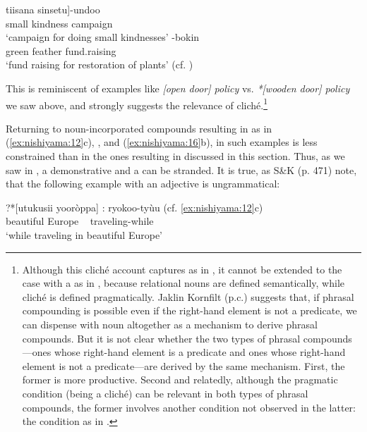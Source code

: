 \documentclass[output=paper]{LSP/langsci}
\begin{document}
\ea\label{ex:nishiyama:26}
 \ea 
 \gll {\ob}tiisana  sinsetu]-undoo\\
     small  {kindness campaign}\\
\glt ‘campaign for doing small kindnesses’
  \ex
  -bokin\\
     green  {feather fund.raising}\\
\glt ‘fund raising for restoration of plants’    (cf. \citealt[129]{Kubozono1995})
\z \z \largerpage

This is reminiscent of examples like \textit{[open door] policy} vs. \textit{*[wooden door] policy} we saw above, and strongly suggests the relevance of cliché.\footnote{Although this cliché account captures   as in , it cannot be extended to the case with a  as in , because relational nouns are defined semantically, while cliché is defined pragmatically. Jaklin Kornfilt (p.c.) suggests that, if phrasal compounding is possible even if the right-hand element is not a predicate, we can dispense with noun  altogether as a mechanism to derive phrasal compounds. But it is not clear whether the two types of phrasal compounds—ones whose right-hand element is a predicate and ones whose right-hand element is not a predicate—are derived by the same mechanism. First, the former is more productive. Second and relatedly, although the pragmatic condition (being a cliché) can be relevant in both types of phrasal compounds, the former involves another condition not observed in the latter: the  condition as in .}

Returning to noun-incorporated compounds resulting in  as in (\ref{ex:nishiyama:12}c), , and (\ref{ex:nishiyama:16}b),   in such examples is less constrained than in the ones resulting in  discussed in this section. Thus, as we saw in , a demonstrative and a  can be stranded. It is true, as S\&K (p. 471) note, that the following example with an adjective is ungrammatical:

\ea\label{ex:nishiyama:27}
\gll    ?*[utukusii yooròppa] : ryokoo-tyùu    (cf. \ref{ex:nishiyama:12}c)\\
       {\db}{\db}beautiful Europe ~  traveling-while\\
\glt ‘while traveling in beautiful Europe’
\z
\end{document}
